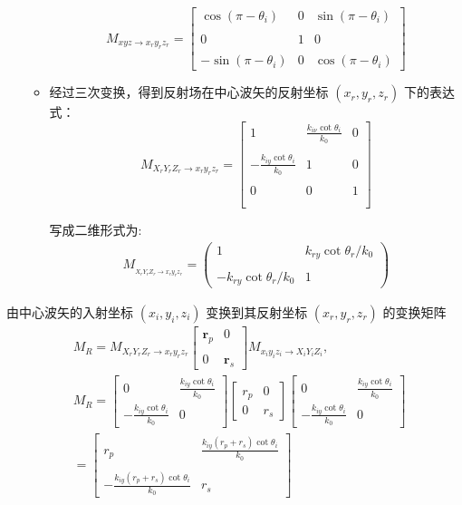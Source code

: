 \documentclass[12pt]{ctexart}
\numberwithin{equation}{section} %
\begin{document}
\begin{enumerate}
\begin{itemize}
    $$M_{xyz\to x_ry_rz_r}=\begin{bmatrix}\cos(\pi-\theta_i)&0&\sin(\pi-\theta_i)\\\\0&1&0\\\\-\sin(\pi-\theta_i)&0&\cos(\pi-\theta_i)\end{bmatrix}$$
    \item 经过三次变换，得到反射场在中心波矢的反射坐标 $(x_r,y_r,z_r)$ 下的表达式：
    $$M_{X_rY_rZ_r\to x_ry_rz_r}=\begin{bmatrix}1&\frac{k_{i\nu}\cot\theta_i}{k_0}&0\\\\-\frac{k_{iy}\cot\theta_i}{k_0}&1&0\\\\0&0&1\\\\\end{bmatrix}$$
    
    写成二维形式为:
    \begin{align*}M_{_{X_rY_rZ_r\to x_ry_rz_r}}=\begin{pmatrix}1&k_{ry}\cot\theta_r/k_0\\\\-k_{ry}\cot\theta_r/k_0&1\end{pmatrix}\end{align*}
\end{itemize}


\end{enumerate}

由中心波矢的入射坐标 $(x_i, y_i, z_i) $ 变换到其反射坐标  $(x_r, y_r, z_r)$ 的变换矩阵
\begin{align*}
    &M_{R} = M_{X_r Y_r Z_r \to x_r y_r z_r} \begin{bmatrix} \boldsymbol{r}_p & 0 \\\\ 0 & \boldsymbol{r}_s \end{bmatrix} M_{x_i y_i z_i \to X_i Y_i Z_i}, \\
    &M_{R} = \begin{bmatrix} 0 & \frac{k_{iy} \cot \theta_i}{k_0} \\ -\frac{k_{iy} \cot \theta_i}{k_0} & 0 \end{bmatrix} \begin{bmatrix} r_p & 0 \\ 0 & r_s \end{bmatrix} \begin{bmatrix} 0 & \frac{k_{iy} \cot \theta_i}{k_0} \\ -\frac{k_{iy} \cot \theta_i}{k_0} & 0 \end{bmatrix} \\
    &= \begin{bmatrix} r_p & \frac{k_{iy} (r_p + r_s) \cot \theta_i}{k_0} \\\\ -\frac{k_{iy} (r_p + r_s) \cot \theta_i}{k_0} & r_s \end{bmatrix}
    \end{align*}
\end{document}
